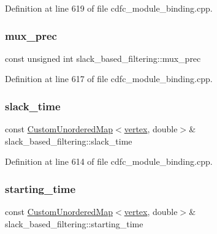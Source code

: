 Definition at line 619 of file cdfc\+\_\+module\+\_\+binding.\+cpp.

\mbox{\label{structslack__based__filtering_a92899a636280e68c9bc54a420acabcfe}} 
\subsubsection{\texorpdfstring{mux\+\_\+prec}{mux\_prec}}
{\footnotesize\ttfamily const unsigned int slack\+\_\+based\+\_\+filtering\+::mux\+\_\+prec\hspace{0.3cm}{\ttfamily [private]}}



Definition at line 617 of file cdfc\+\_\+module\+\_\+binding.\+cpp.

\mbox{\label{structslack__based__filtering_a3f1700043f1f8aa0f7024c5818f790b5}} 
\subsubsection{\texorpdfstring{slack\+\_\+time}{slack\_time}}
{\footnotesize\ttfamily const \hyperlink{custom__map_8hpp_ad1ed68f2ff093683ab1a33522b144adc}{Custom\+Unordered\+Map}$<$\hyperlink{graph_8hpp_abefdcf0544e601805af44eca032cca14}{vertex}, double$>$\& slack\+\_\+based\+\_\+filtering\+::slack\+\_\+time\hspace{0.3cm}{\ttfamily [private]}}



Definition at line 614 of file cdfc\+\_\+module\+\_\+binding.\+cpp.

\mbox{\label{structslack__based__filtering_a6ca7c17e1dd2e4adf70f1f8b919f3dbb}} 
\subsubsection{\texorpdfstring{starting\+\_\+time}{starting\_time}}
{\footnotesize\ttfamily const \hyperlink{custom__map_8hpp_ad1ed68f2ff093683ab1a33522b144adc}{Custom\+Unordered\+Map}$<$\hyperlink{graph_8hpp_abefdcf0544e601805af44eca032cca14}{vertex}, double$>$\& slack\+\_\+based\+\_\+filtering\+::starting\+\_\+time\hspace{0.3cm}{\ttfamily [private]}}



